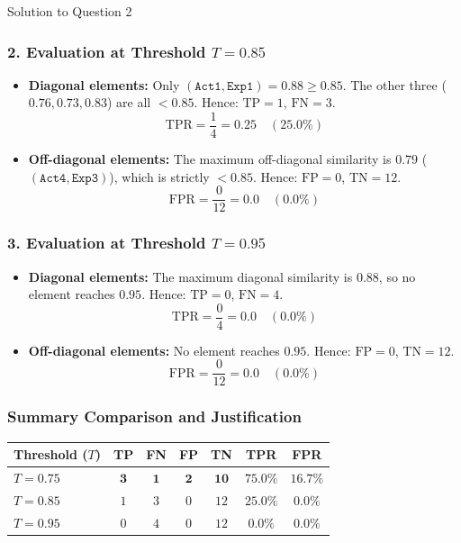 \documentclass[11pt,a4paper]{article}
\begin{document}
\begin{solutionbox}{Solution to Question 2}
\subsubsection*{2. Evaluation at Threshold $T = 0.85$}
\begin{itemize}
    \item \textbf{Diagonal elements:}
    Only $(\texttt{Act1}, \texttt{Exp1}) = 0.88 \ge 0.85$. The other three ($0.76, 0.73, 0.83$) are all $< 0.85$.
    Hence: $\text{TP} = 1$, $\text{FN} = 3$.
    \begin{equation*}
    \text{TPR} = \frac{1}{4} = \mathbf{0.25} \quad (25.0\%)
    \end{equation*}
    \item \textbf{Off-diagonal elements:}
    The maximum off-diagonal similarity is $0.79$ ($(\texttt{Act4}, \texttt{Exp3})$), which is strictly $< 0.85$.
    Hence: $\text{FP} = 0$, $\text{TN} = 12$.
    \begin{equation*}
    \text{FPR} = \frac{0}{12} = \mathbf{0.0} \quad (0.0\%)
    \end{equation*}
\end{itemize}

\subsubsection*{3. Evaluation at Threshold $T = 0.95$}
\begin{itemize}
    \item \textbf{Diagonal elements:}
    The maximum diagonal similarity is $0.88$, so no element reaches $0.95$.
    Hence: $\text{TP} = 0$, $\text{FN} = 4$.
    \begin{equation*}
    \text{TPR} = \frac{0}{4} = \mathbf{0.0} \quad (0.0\%)
    \end{equation*}
    \item \textbf{Off-diagonal elements:}
    No element reaches $0.95$.
    Hence: $\text{FP} = 0$, $\text{TN} = 12$.
    \begin{equation*}
    \text{FPR} = \frac{0}{12} = \mathbf{0.0} \quad (0.0\%)
    \end{equation*}
\end{itemize}

\subsubsection*{Summary Comparison and Justification}
\begin{center}
\begin{tabular}{lcccccc}
\toprule
\textbf{Threshold ($T$)} & \textbf{TP} & \textbf{FN} & \textbf{FP} & \textbf{TN} & \textbf{TPR} & \textbf{FPR} \\
\midrule
$T = \mathbf{0.75}$ & $\mathbf{3}$ & $\mathbf{1}$ & $\mathbf{2}$ & $\mathbf{10}$ & $\mathbf{75.0\%}$ & $\mathbf{16.7\%}$ \\
$T = 0.85$ & $1$ & $3$ & $0$ & $12$ & $25.0\%$ & $0.0\%$ \\
$T = 0.95$ & $0$ & $4$ & $0$ & $12$ & $0.0\%$ & $0.0\%$ \\
\bottomrule
\end{tabular}
\end{center}


\end{solutionbox}
\end{document}

